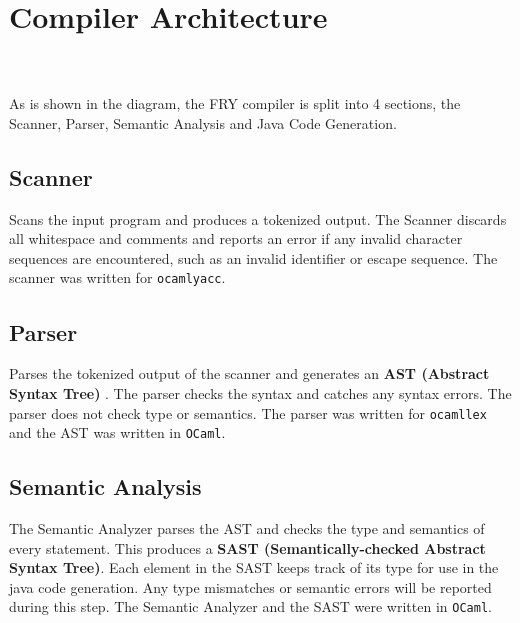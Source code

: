 \documentclass{article}
\begin{document}
\section{Compiler Architecture}
\\ \\ 
As is shown in the diagram, the FRY compiler is split into 4 sections, the Scanner, Parser, Semantic Analysis and Java Code Generation. 
\subsection{Scanner} 
Scans the input program and produces a tokenized output. The Scanner discards all whitespace and comments and reports an error if any invalid character sequences are encountered, such as an invalid identifier or escape sequence. The scanner was written for \texttt{ocamlyacc}.
\subsection{Parser}
Parses the tokenized output of the scanner and generates an \textbf{AST (Abstract Syntax Tree)} . The parser checks the syntax and catches any syntax errors. The parser does not check type or semantics. The parser was written for \texttt{ocamllex} and the AST was written in \texttt{OCaml}.
\subsection{Semantic Analysis}
The Semantic Analyzer parses the AST and checks the type and semantics of every statement. This produces a \textbf{SAST (Semantically-checked Abstract Syntax Tree)}. Each element in the SAST keeps track of its type for use in the java code generation. Any type mismatches or semantic errors will be reported during this step. The Semantic Analyzer and the SAST were written in \texttt{OCaml}.
\end{document}
